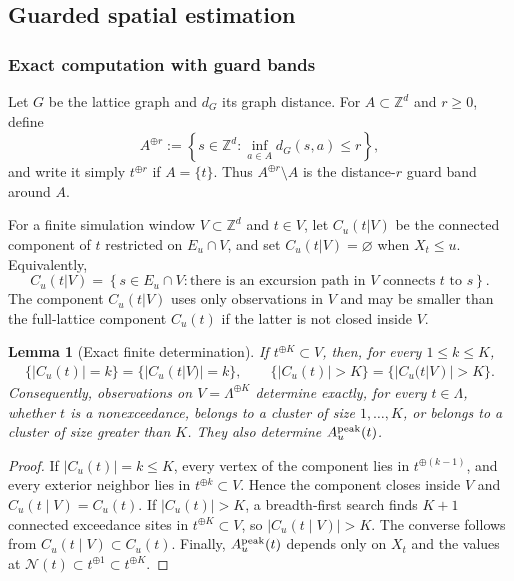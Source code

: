 \documentclass[aap,preprint]{imsart}
\theoremstyle{plain}
\newtheorem{lemma}[theorem]{Lemma}
\theoremstyle{definition}
\def\Z{{\mathbb Z}}
\begin{document}
\subsection{Guarded spatial estimation}

\subsubsection{Exact computation with guard bands}
\label{sec:mc-guard}

Let $G$ be the lattice graph and $d_G$ its graph distance.  For
$A\subset\Z^d$ and $r\geq0$, define 
\begin{equation*}
	A^{\oplus r}:=\left\{s\in\Z^d: \inf_{a\in A}d_G(s,a)\leq r\right\},
\end{equation*}
and write it simply $t^{\oplus r}$ if $A=\{t\}$. Thus $A^{\oplus r}\setminus A$ is the distance-$r$ guard band around
$A$.

For a finite simulation window $V\subset\Z^d$ and $t\in V$, let $C_u(t|V)$ be the connected component of $t$ restricted on $E_u\cap V$, and set $C_u(t|V)=\varnothing$ when $X_t\leq u$.
Equivalently,
\begin{equation*}
	C_u(t|V)
	=
	\left\{s\in E_u\cap V:
		\text{there is an excursion path in $V$ connects $t$ to $s$}
	\right\}.
\end{equation*}
The component $C_u(t|V)$ uses only observations in $V$ and may be smaller
than the full-lattice component $C_u(t)$ if the latter is not closed inside
$V$.

\begin{lemma}[Exact finite determination]
	\label{lem:mc-guard-band}
	If $t^{\oplus K}\subset V$, then, for every $1\leq k\leq K$,
	\begin{align*}
		\{|C_u(t)|=k\}=\{|C_u(t|V)|=k\},
		\qquad
		\{|C_u(t)|>K\}=\{|C_u(t|V)|>K\}.
	\end{align*}
	Consequently, observations on $V=\Lambda^{\oplus K}$ determine exactly,
	for every $t\in\Lambda$, whether $t$ is a nonexceedance, belongs to a
	cluster of size $1,\ldots,K$, or belongs to a cluster of size greater than
	$K$.  They also determine $A_u^{\rm peak}(t)$.
\end{lemma}

\begin{proof}
	If $|C_u(t)|=k\leq K$, every vertex of the component lies in
	$t^{\oplus(k-1)}$, and every exterior neighbor lies in
	$t^{\oplus k}\subset V$.  Hence the component closes inside $V$ and
	$C_u(t\mid V)=C_u(t)$.  If $|C_u(t)|>K$, a breadth-first search finds
	$K+1$ connected exceedance sites in $t^{\oplus K}\subset V$, so
	$|C_u(t\mid V)|>K$. The converse follows from
	$C_u(t\mid V)\subset C_u(t)$.
	Finally, $A_u^{\rm peak}(t)$ depends only on $X_t$ and the values at
	$\mathcal N(t)\subset t^{\oplus 1}\subset t^{\oplus K}$.
\end{proof}
\end{document}
